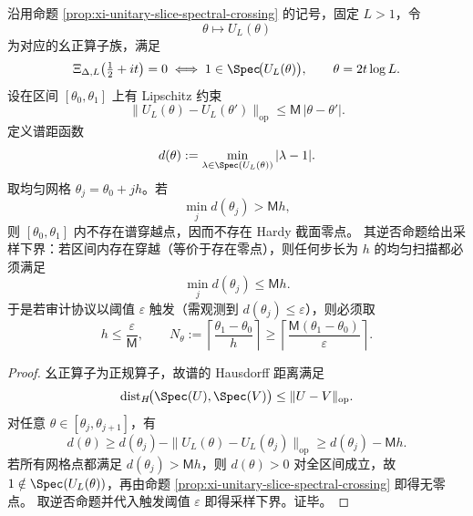 \begin{conclusion}\label{con:xi-unitary-slice-cross-audit-sampling-lower-bound}
沿用命题 \ref{prop:xi-unitary-slice-spectral-crossing} 的记号，固定 \(L>1\)，令
\[
\theta\mapsto U_L(\theta)
\]
为对应的幺正算子族，满足
\[
\Xi_{\Delta,L}\!\left(\tfrac12+it\right)=0
\iff
1\in\Spec\!\bigl(U_L(\theta)\bigr),\qquad \theta=2t\log L.
\]
设在区间 \([\theta_0,\theta_1]\) 上有 Lipschitz 约束
\[
\|U_L(\theta)-U_L(\theta')\|_{\mathrm{op}}
\le
\mathsf M\,|\theta-\theta'|.
\]
定义谱距函数
\[
d(\theta):=\min_{\lambda\in\Spec(U_L(\theta))}|\lambda-1|.
\]
取均匀网格 \(\theta_j=\theta_0+jh\)。若
\[
\min_j d(\theta_j)>\mathsf M h,
\]
则 \([\theta_0,\theta_1]\) 内不存在谱穿越点，因而不存在 Hardy 截面零点。
其逆否命题给出采样下界：若区间内存在穿越（等价于存在零点），则任何步长为 \(h\) 的均匀扫描都必须满足
\[
\min_j d(\theta_j)\le \mathsf M h.
\]
于是若审计协议以阈值 \(\varepsilon\) 触发（需观测到 \(d(\theta_j)\le\varepsilon\)），则必须取
\[
h\le \frac{\varepsilon}{\mathsf M},
\qquad
N_\theta:=\left\lceil\frac{\theta_1-\theta_0}{h}\right\rceil
\ge
\left\lceil\frac{\mathsf M(\theta_1-\theta_0)}{\varepsilon}\right\rceil.
\]
\end{conclusion}
\begin{proof}
幺正算子为正规算子，故谱的 Hausdorff 距离满足
\[
\mathrm{dist}_H\!\bigl(\Spec(U),\Spec(V)\bigr)\le \|U-V\|_{\mathrm{op}}.
\]
对任意 \(\theta\in[\theta_j,\theta_{j+1}]\)，有
\[
d(\theta)
\ge
d(\theta_j)-\|U_L(\theta)-U_L(\theta_j)\|_{\mathrm{op}}
\ge
d(\theta_j)-\mathsf M h.
\]
若所有网格点都满足 \(d(\theta_j)>\mathsf M h\)，则 \(d(\theta)>0\) 对全区间成立，故 \(1\notin\Spec(U_L(\theta))\)，再由命题 \ref{prop:xi-unitary-slice-spectral-crossing} 即得无零点。
取逆否命题并代入触发阈值 \(\varepsilon\) 即得采样下界。证毕。
\end{proof}

